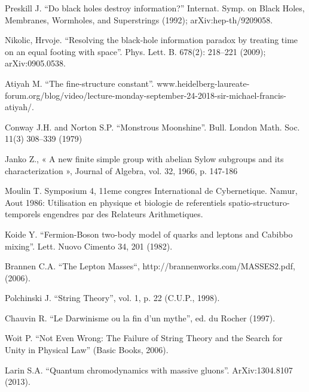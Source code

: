 \documentclass[twoside,draft]{article}
\begin{document}
\begin{sloppypar}
\begin{thebibliography}{99}
 Preskill J. ``Do black holes destroy information?'' Internat.
Symp. on Black Holes, Membranes, Wormholes, and Superstrings (1992);
arXiv:hep-th/9209058.

 Nikolic, Hrvoje. ``Resolving the black-hole information paradox by
treating time on an equal footing with space''. Phys. Lett. B. 678(2):
218--221 (2009); arXiv:0905.0538.

 Atiyah M. ``The fine-structure constant''. www.heidelberg-laureate-forum.org/blog/video/lecture-monday-september-24-2018-sir-michael-francis-atiyah/.

 Conway J.H. and Norton S.P. ``Monstrous Moonshine''. Bull. London
Math. Soc. 11(3) 308--339 (1979)


 Janko Z., « A new finite simple group with abelian Sylow subgroups and its characterization », Journal of Algebra, vol. 32, 1966, p. 147-186

 Moulin T. Symposium 4, 11eme congres International de Cybernetique. Namur, Aout 1986: Utilisation en physique et biologie de referentiels spatio-structuro-temporels engendres par des Relateurs Arithmetiques. 

 Koide Y. ``Fermion-Boson two-body model of quarks and leptons and
Cabibbo mixing''.  Lett. Nuovo Cimento 34, 201 (1982).

 Brannen C.A. ``The Lepton Masses``, http://brannenworks.com/MASSES2.pdf, (2006).

 Polchinski J. ``String Theory'', vol. 1, p. 22 (C.U.P., 1998).

 Chauvin R. ``Le Darwinisme ou la fin d'un mythe'', ed. du Rocher
(1997).

 Woit P. ``Not Even Wrong: The Failure of String Theory and the
Search for Unity in Physical Law'' (Basic Books, 2006).

 Larin S.A. ``Quantum chromodynamics with massive gluons''.
ArXiv:1304.8107 (2013).


\end{thebibliography}
\end{sloppypar}
\end{document}
